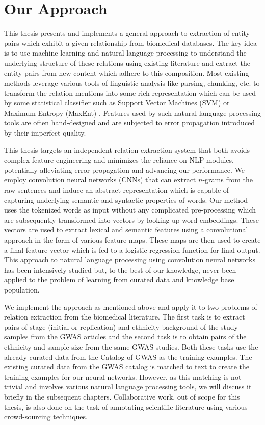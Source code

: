 \section{Our Approach}
\label{section:our-approach}
This thesis presents and implements a general approach to extraction of entity pairs which exhibit a given relationship from biomedical databases. The key idea is to use machine learning and natural language processing to understand the underlying structure of these relations using existing literature and extract the entity pairs from new content which adhere to this composition. Most existing methods leverage various tools of linguistic analysis like parsing, chunking, etc. to transform the relation mentions into some rich representation which can be used by some statistical classifier such as Support Vector Machines (SVM) \cite{hong2005relation} or Maximum Entropy (MaxEnt) \cite{yao2010multi}. Features used by such natural language processing tools are often hand-designed and are subjected to error propagation introduced by their imperfect quality. 

This thesis targets an independent relation extraction system that both avoids complex feature engineering and minimizes the reliance on NLP modules, potentially alleviating error propagation and advancing our performance. We employ convolution neural networks (CNNs) that can extract $n$-grams from the raw sentences and induce an abstract representation which is capable of capturing underlying semantic and syntactic properties of words. Our method uses the tokenized words as input without any complicated pre-processing which are subsequently transformed into vectors by looking up word embeddings. These vectors are used to extract lexical and semantic features using a convolutional approach in the form of various feature maps. These maps are then used to create a final feature vector which is fed to a logistic regression function for final output. This approach to natural language processing using convolution neural networks has been intensively studied but, to the best of our knowledge, never been applied to the problem of learning from curated data and knowledge base population.

We implement the approach as mentioned above and apply it to two problems of relation extraction from the biomedical literature. The first task is to extract pairs of stage (initial or replication) and ethnicity background of the study samples from the GWAS articles and the second task is to obtain pairs of the ethnicity and sample size from the same GWAS studies. Both these tasks use the already curated data from the Catalog of GWAS as the training examples. The existing curated data from the GWAS catalog is matched to text to create the training examples for our neural networks. However, as this matching is not trivial and involves various natural language processing tools, we will discuss it briefly in the subsequent chapters. Collaborative work, out of scope for this thesis, is also done on the task of annotating scientific literature using various crowd-sourcing techniques. 

